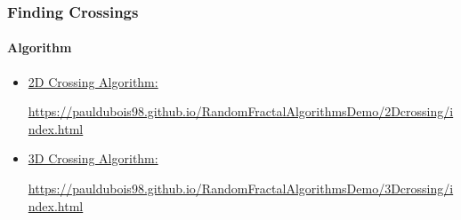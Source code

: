 \documentclass{beamer}
\begin{document}
	\begin{frame}
		\frametitle{Finding Crossings}
		\framesubtitle{Algorithm}
		\begin{itemize}
			\item \href{https://pauldubois98.github.io/RandomFractalAlgorithmsDemo/2Dcrossing/index.html}{2D Crossing Algorithm:}
			
			\url{https://pauldubois98.github.io/RandomFractalAlgorithmsDemo/2Dcrossing/index.html}
			
			\item \href{https://pauldubois98.github.io/RandomFractalAlgorithmsDemo/3Dcrossing/index.html}{3D Crossing Algorithm:}
			
			\url{https://pauldubois98.github.io/RandomFractalAlgorithmsDemo/3Dcrossing/index.html}
		\end{itemize}
	\end{frame}

\end{document}
